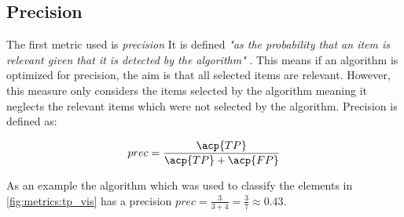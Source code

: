 \subsection{Precision}
\label{chp:fundamentals:sec:metrics:subsec:precision}

The first metric used is \textit{precision}
It is defined \textit{"as the probability that an item is relevant given that it is detected by the algorithm"} \parencite{Zhu:2004}.
This means if an algorithm is optimized for precision, the aim is that all selected items are relevant.
However, this measure only considers the items selected by the algorithm meaning it neglects the relevant items which were not selected by the algorithm.
Precision is defined as:

\begin{equation}\label{eq:precision}
    prec = \frac{\acp{TP}}{\acp{TP}+\acp{FP}}
\end{equation}

As an example the algorithm which was used to classify the elements in \cref{fig:metrics:tp_vis} has a precision $prec = \frac{3}{3+4} = \frac{3}{7}\approx 0.43$.
